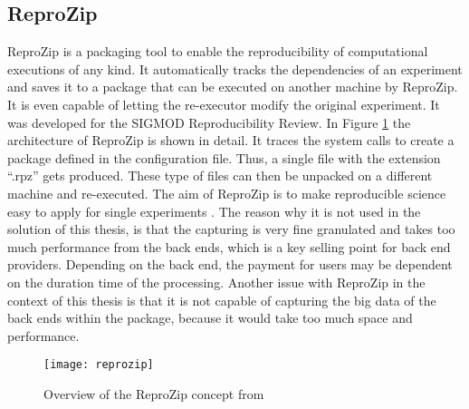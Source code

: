 \documentclass[draft,final]{vutinfth} %
\begin{document}
\subsection{ReproZip}\label{ReproZip}
ReproZip is a packaging tool to enable the reproducibility of computational executions of any kind. It automatically tracks the dependencies of an experiment and saves it to a package that can be executed on another machine by ReproZip. It is even capable of letting the re-executor modify the original experiment. It was developed for the SIGMOD Reproducibility Review. In Figure \ref{fig:reprozip} the architecture of ReproZip is shown in detail. It traces the system calls to create a package defined in the configuration file. Thus, a single file with the extension “.rpz” gets produced. These type of files can then be unpacked on a different machine and re-executed. The aim of ReproZip is to make reproducible science easy to apply for single experiments \cite{29c5846926a4497d95f276604cb0368c}. The reason why it is not used in the solution of this thesis, is that the capturing is very fine granulated and takes too much performance from the back ends, which is a key selling point for back end providers. Depending on the back end, the payment for users may be dependent on the duration time of the processing. Another issue with ReproZip in the context of this thesis is that it is not capable of capturing the big data of the back ends within the package, because it would take too much space and performance.  

\begin{figure}[h]
	\centering
	\texttt{[image: reprozip]}
	\caption{Overview of the ReproZip concept from \cite{29c5846926a4497d95f276604cb0368c} }
	\label{fig:reprozip} %
\end{figure}
\end{document}
